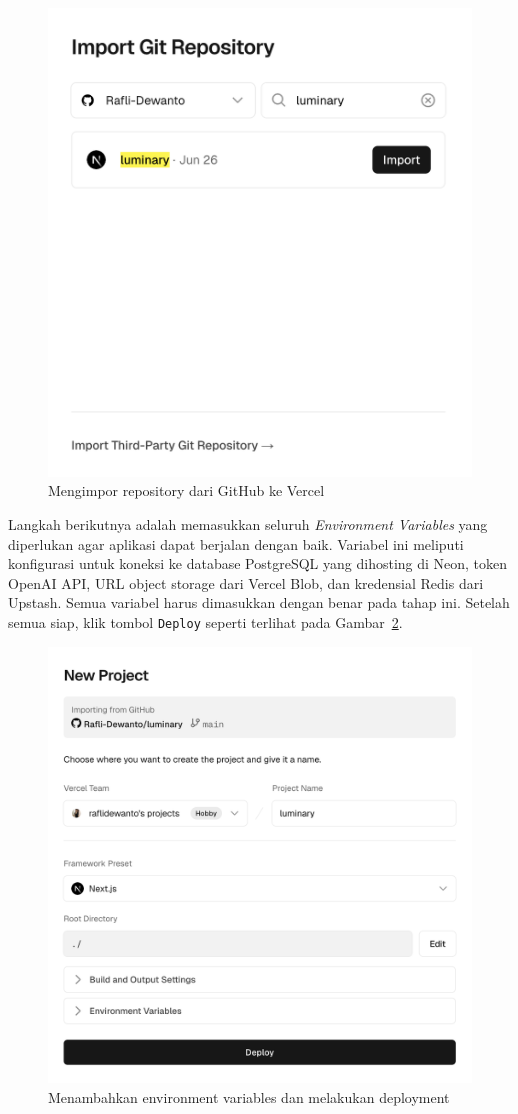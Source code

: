 \begin{figure}[H]
  \centering
  \includegraphics[width=0.85\linewidth]{images/bab-3/deploy-2.png}
  \caption{Mengimpor repository dari GitHub ke Vercel}\label{fig:pilih-repository}
\end{figure}

Langkah berikutnya adalah memasukkan seluruh \textit{Environment Variables} yang diperlukan agar aplikasi dapat berjalan dengan baik. Variabel ini meliputi konfigurasi untuk koneksi ke database PostgreSQL yang dihosting di Neon, token OpenAI API, URL object storage dari Vercel Blob, dan kredensial Redis dari Upstash. Semua variabel harus dimasukkan dengan benar pada tahap ini. Setelah semua siap, klik tombol \texttt{Deploy} seperti terlihat pada Gambar~\ref{fig:deploy-project}.

\begin{figure}[H]
  \centering
  \includegraphics[width=0.85\linewidth]{images/bab-3/deploy-3.png}
  \caption{Menambahkan environment variables dan melakukan deployment}\label{fig:deploy-project}
\end{figure}


